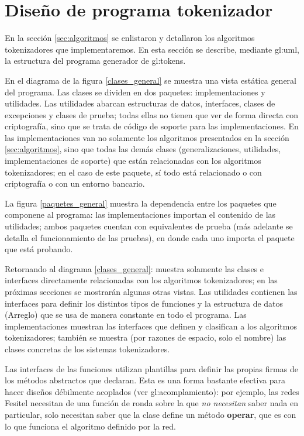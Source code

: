 %
%

\section{Diseño de programa tokenizador}

En la sección \ref{sec:algoritmos} se enlistaron y detallaron los algoritmos
tokenizadores que implementaremos. En esta sección se describe, mediante
\gls{gl:uml}, la estructura del programa generador de \glspl{gl:token}.

En el diagrama de la figura \ref{clases_general} se muestra una vista estática
general del programa. Las clases se dividen en dos paquetes: implementaciones
y utilidades. Las utilidades abarcan estructuras de datos, interfaces,
clases de excepciones y clases de prueba; todas ellas no tienen que ver
de forma directa con criptografía, sino que se trata de código de soporte
para las implementaciones. En las implementaciones van no solamente
los algoritmos presentados en la sección \ref{sec:algoritmos}, sino que todas
las demás clases (generalizaciones, utilidades, implementaciones de
soporte) que están relacionadas con los algoritmos tokenizadores; en el caso
de este paquete, sí todo está relacionado o con criptografía o con un
entorno bancario.

La figura \ref{paquetes_general} muestra la dependencia entre los paquetes que
componene al programa: las implementaciones importan el contenido de las
utilidades; ambos paquetes cuentan con equivalentes de prueba (más adelante se
detalla el funcionamiento de las pruebas), en donde cada uno importa el paquete
que está probando.

Retornando al diagrama \ref{clases_general}: muestra solamente las clases
e interfaces directamente relacionadas con los algoritmos tokenizadores;
en las próximas secciones se mostrarán algunas otras vistas. Las utilidades
contienen las interfaces para definir los distintos tipos de funciones y la
estructura de datos (Arreglo) que se usa de manera constante en todo el
programa. Las implementaciones muestran las interfaces que definen y clasifican
a los algoritmos tokenizadores; también se muestra (por razones de espacio,
solo el nombre) las clases concretas de los sistemas tokenizadores.

Las interfaces de las funciones utilizan plantillas para definir las propias
firmas de los métodos abstractos que declaran. Esta es una forma bastante
efectiva para hacer diseños débilmente acoplados (ver
\gls{gl:acomplamiento}): por ejemplo, las redes Fesitel necesitan
de una función de ronda sobre la que \textit{no necesitan} saber nada en
particular, solo necesitan saber que la clase define un método \textbf{operar},
que es con lo que funciona el algoritmo definido por la red.

